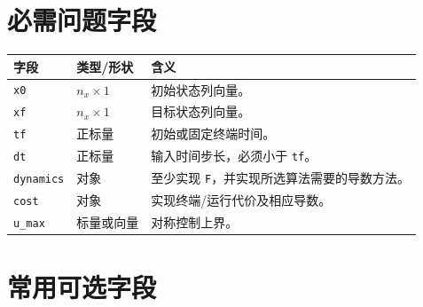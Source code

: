 \documentclass[UTF8,zihao=-4,openany,fontset=fandol]{ctexbook}
\newcommand{\code}[1]{\nolinkurl{#1}}
\begin{document}
\section{必需问题字段}

\begin{longtable}{p{}p{}p{}}
\toprule
字段 & 类型/形状 & 含义\\
\midrule
\endhead
\code{x0} & $n_x\times1$ & 初始状态列向量。\\
\code{xf} & $n_x\times1$ & 目标状态列向量。\\
\code{tf} & 正标量 & 初始或固定终端时间。\\
\code{dt} & 正标量 & 输入时间步长，必须小于 \code{tf}。\\
\code{dynamics} & 对象 & 至少实现 \code{F}，并实现所选算法需要的导数方法。\\
\code{cost} & 对象 & 实现终端/运行代价及相应导数。\\
\code{u_max} & 标量或向量 & 对称控制上界。\\
\bottomrule
\end{longtable}

\section{常用可选字段}
\end{document}
